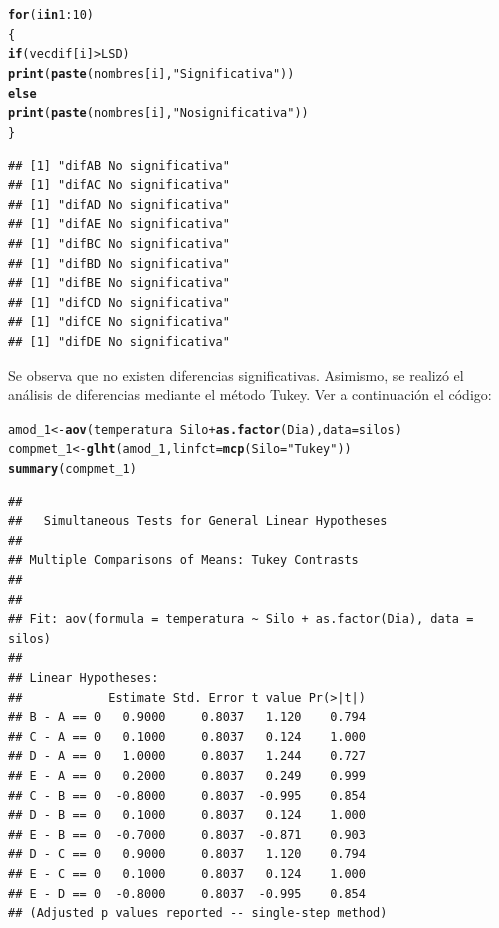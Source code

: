 \documentclass[10pt,a4paper]{article}\usepackage[]{graphicx}\usepackage[]{color}
\makeatletter
\newcommand{\hlnum}[1]{\textcolor[rgb]{0.686,0.059,0.569}{#1}}%
\newcommand{\hlstr}[1]{\textcolor[rgb]{0.192,0.494,0.8}{#1}}%
\newcommand{\hlopt}[1]{\textcolor[rgb]{0,0,0}{#1}}%
\newcommand{\hlstd}[1]{\textcolor[rgb]{0.345,0.345,0.345}{#1}}%
\newcommand{\hlkwa}[1]{\textcolor[rgb]{0.161,0.373,0.58}{\textbf{#1}}}%
\newcommand{\hlkwb}[1]{\textcolor[rgb]{0.69,0.353,0.396}{#1}}%
\newcommand{\hlkwc}[1]{\textcolor[rgb]{0.333,0.667,0.333}{#1}}%
\newcommand{\hlkwd}[1]{\textcolor[rgb]{0.737,0.353,0.396}{\textbf{#1}}}%
\newenvironment{kframe}{%
 \def\at@end@of@kframe{}%
 \ifinner\ifhmode%
  \def\at@end@of@kframe{\end{minipage}}%
  \begin{minipage}{\columnwidth}%
 \fi\fi%
 \def\FrameCommand##1{\hskip\@totalleftmargin \hskip-\fboxsep
 \colorbox{shadecolor}{##1}\hskip-\fboxsep
     \hskip-\linewidth \hskip-\@totalleftmargin \hskip\columnwidth}%
 \MakeFramed {\advance\hsize-\width
   \@totalleftmargin\z@ \linewidth\hsize
   \@setminipage}}%
 {\par\unskip\endMakeFramed%
 \at@end@of@kframe}
\newenvironment{knitrout}{}{} %
\makeatother
\begin{document}
\begin{knitrout}
\begin{kframe}
\begin{alltt}
\hlkwa{for}\hlstd{(i} \hlkwa{in} \hlnum{1}\hlopt{:}\hlnum{10}\hlstd{)}
\hlstd{\{}
  \hlkwa{if}\hlstd{(vecdif[i]}\hlopt{>}\hlstd{LSD)}
    \hlkwd{print}\hlstd{(}\hlkwd{paste}\hlstd{(nombres[i],}\hlstr{"Significativa"}\hlstd{))}
  \hlkwa{else}
    \hlkwd{print}\hlstd{(}\hlkwd{paste}\hlstd{(nombres[i],}\hlstr{"No significativa"}\hlstd{))}
\hlstd{\}}
\end{alltt}
\begin{verbatim}
## [1] "difAB No significativa"
## [1] "difAC No significativa"
## [1] "difAD No significativa"
## [1] "difAE No significativa"
## [1] "difBC No significativa"
## [1] "difBD No significativa"
## [1] "difBE No significativa"
## [1] "difCD No significativa"
## [1] "difCE No significativa"
## [1] "difDE No significativa"
\end{verbatim}
\end{kframe}
\end{knitrout}

Se observa que no existen diferencias significativas. Asimismo, se realizó el análisis de diferencias mediante el método Tukey. Ver a continuación el código:

\begin{knitrout}\small
{}\color{fgcolor}\begin{kframe}
\begin{alltt}
\hlstd{amod_1} \hlkwb{<-} \hlkwd{aov}\hlstd{(temperatura} \hlopt{~} \hlstd{Silo} \hlopt{+} \hlkwd{as.factor}\hlstd{(Dia),} \hlkwc{data} \hlstd{= silos)}
\hlstd{compmet_1} \hlkwb{<-} \hlkwd{glht}\hlstd{(amod_1,} \hlkwc{linfct} \hlstd{=} \hlkwd{mcp}\hlstd{(}\hlkwc{Silo} \hlstd{=} \hlstr{"Tukey"}\hlstd{))}
\hlkwd{summary}\hlstd{(compmet_1)}
\end{alltt}
\begin{verbatim}
## 
## 	 Simultaneous Tests for General Linear Hypotheses
## 
## Multiple Comparisons of Means: Tukey Contrasts
## 
## 
## Fit: aov(formula = temperatura ~ Silo + as.factor(Dia), data = silos)
## 
## Linear Hypotheses:
##            Estimate Std. Error t value Pr(>|t|)
## B - A == 0   0.9000     0.8037   1.120    0.794
## C - A == 0   0.1000     0.8037   0.124    1.000
## D - A == 0   1.0000     0.8037   1.244    0.727
## E - A == 0   0.2000     0.8037   0.249    0.999
## C - B == 0  -0.8000     0.8037  -0.995    0.854
## D - B == 0   0.1000     0.8037   0.124    1.000
## E - B == 0  -0.7000     0.8037  -0.871    0.903
## D - C == 0   0.9000     0.8037   1.120    0.794
## E - C == 0   0.1000     0.8037   0.124    1.000
## E - D == 0  -0.8000     0.8037  -0.995    0.854
## (Adjusted p values reported -- single-step method)
\end{verbatim}
\end{kframe}
\end{knitrout}
\end{document}
